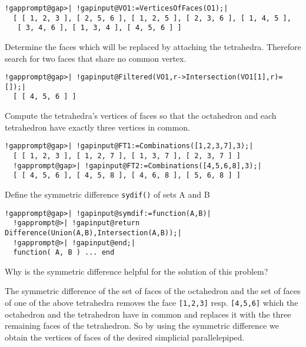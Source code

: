 \documentclass[a4paper,11pt]{report}
\begin{document}
{{{\begin{Verbatim}[commandchars=!@|,fontsize=\small,frame=single,label=Example]
  !gapprompt@gap>| !gapinput@VO1:=VerticesOfFaces(O1);|
  [ [ 1, 2, 3 ], [ 2, 5, 6 ], [ 1, 2, 5 ], [ 2, 3, 6 ], [ 1, 4, 5 ],
   [ 3, 4, 6 ], [ 1, 3, 4 ], [ 4, 5, 6 ] ]
\end{Verbatim}
 

 Determine the faces which will be replaced by attaching the tetrahedra.
Therefore search for two faces that share no common vertex. 

 
\begin{Verbatim}[commandchars=!@|,fontsize=\small,frame=single,label=Example]
  !gapprompt@gap>| !gapinput@Filtered(VO1,r->Intersection(VO1[1],r)=[]);|
  [ [ 4, 5, 6 ] ]
\end{Verbatim}
 

 
\begin{center}

\end{center}
 

 Compute the tetrahedra's vertices of faces so that the octahedron and each
tetrahedron have exactly three vertices in common. 

 
\begin{Verbatim}[commandchars=!@|,fontsize=\small,frame=single,label=Example]
  !gapprompt@gap>| !gapinput@FT1:=Combinations([1,2,3,7],3);|
  [ [ 1, 2, 3 ], [ 1, 2, 7 ], [ 1, 3, 7 ], [ 2, 3, 7 ] ]
  !gapprompt@gap>| !gapinput@FT2:=Combinations([4,5,6,8],3);|
  [ [ 4, 5, 6 ], [ 4, 5, 8 ], [ 4, 6, 8 ], [ 5, 6, 8 ] ]
\end{Verbatim}
 

 Define the symmetric difference \texttt{sydif()} of sets A and B 

 
\begin{Verbatim}[commandchars=!@|,fontsize=\small,frame=single,label=Example]
  !gapprompt@gap>| !gapinput@symdif:=function(A,B)|
  !gapprompt@>| !gapinput@return Difference(Union(A,B),Intersection(A,B));|
  !gapprompt@>| !gapinput@end;|
  function( A, B ) ... end
\end{Verbatim}
 

 Why is the symmetric difference helpful for the solution of this problem? 

 The symmetric difference of the set of faces of the octahedron and the set of
faces of one of the above tetrahedra removes the face \texttt{[1,2,3]} resp. \texttt{[4,5,6]} which the octahedron and the tetrahedron have in common and replaces it with
the three remaining faces of the tetrahedron. So by using the symmetric
difference we obtain the vertices of faces of the desired simplicial
parallelepiped. 

}}}
\end{document}
